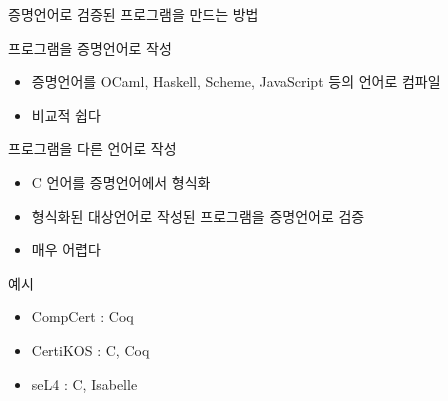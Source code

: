 \documentclass{beamer}
\begin{document}
\begin{frame}{증명언어로 검증된 프로그램을 만드는 방법}

  \begin{block}{프로그램을 증명언어로 작성}
    \begin{itemize}
      \item 증명언어를 OCaml, Haskell, Scheme, JavaScript 등의 언어로 컴파일
      \item 비교적 쉽다
    \end{itemize}
  \end{block}

  \pause
  \begin{block}{프로그램을 다른 언어로 작성}
    \begin{itemize}
      \item C 언어를 증명언어에서 형식화
      \item 형식화된 대상언어로 작성된 프로그램을 증명언어로 검증
      \item 매우 어렵다
    \end{itemize}
  \end{block}

  \pause
  \begin{block}{예시}
    \begin{itemize}
      \item CompCert : Coq
      \item CertiKOS : C, Coq
      \item seL4 : C, Isabelle
    \end{itemize}
  \end{block}

\end{frame}
\end{document}

